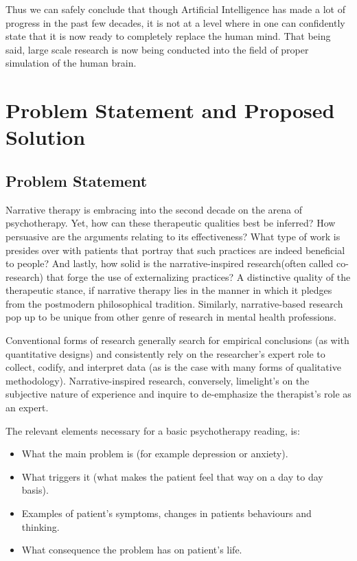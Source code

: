 \documentclass[conference,compsoc]{IEEEtran}
\begin{document}
Thus we can safely conclude that though Artificial Intelligence has made a lot of progress in the past few decades, it is not at a level where in one can confidently state that it is now ready to completely replace the human mind. That being said, large scale research is now being conducted into the field of proper simulation of the human brain.


\section{Problem Statement and Proposed Solution}

\subsection{Problem Statement}

Narrative therapy is embracing into the second decade on the arena of psychotherapy. Yet, how can these therapeutic qualities best be inferred? How persuasive are the arguments relating to its effectiveness? What type of work is presides over with patients that portray that such practices are indeed beneficial to people? And lastly, how solid is the narrative-inspired research(often called co-research) that forge the use of externalizing practices? A distinctive quality of the therapeutic stance, if narrative therapy lies in the manner in which it pledges from the postmodern philosophical tradition. Similarly, narrative-based research pop up to be unique from other genre of research in mental health professions.

Conventional forms of research generally search for empirical conclusions (as with quantitative designs) and consistently rely on the researcher’s expert role to collect, codify, and interpret data (as is the case with many forms of qualitative methodology). Narrative-inspired research, conversely, limelight’s on the subjective nature of experience and inquire to de-emphasize the therapist’s role as an expert.

The relevant elements necessary for a basic psychotherapy reading, is:
\begin{itemize}
    \item What the main problem is (for example depression or anxiety).
    \item What triggers it (what makes the patient feel that way on a day to day basis).
    \item Examples of patient's symptoms, changes in patients behaviours and thinking.
    \item What consequence the problem has on patient's life.
\end{itemize}
\end{document}
